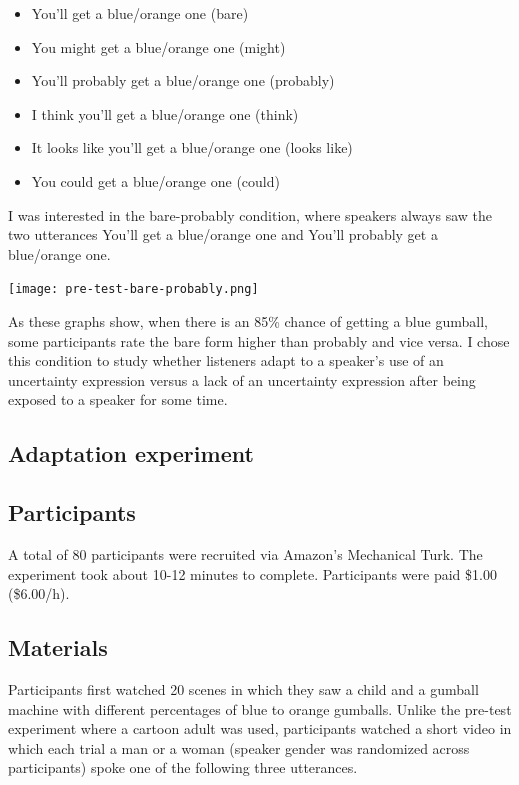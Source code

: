 \documentclass{sp}          %
\begin{document}
\begin{itemize}
\item You’ll get a blue/orange one (bare)
\item You might get a blue/orange one (might)
\item You’ll probably get a blue/orange one (probably)
\item I think you’ll get a blue/orange one (think)
\item It looks like you’ll get a blue/orange one (looks like) 
\item You could get a blue/orange one (could) 
\end{itemize}

I was interested in the bare-probably condition, where speakers always saw the two utterances You’ll get a blue/orange one and You’ll probably get a blue/orange one. 

\begin{center}
\texttt{[image: pre-test-bare-probably.png]}
\end{center}

As these graphs show, when there is an 85\% chance of getting a blue gumball, some participants rate the bare form higher than probably and vice versa. I chose this condition to study whether listeners adapt to a speaker’s use of an uncertainty expression versus a lack of an uncertainty expression after being exposed to a speaker for some time. 

\subsection{Adaptation experiment}

\subsection{Participants}
A total of 80 participants were recruited via Amazon’s Mechanical Turk. The experiment took about 10-12 minutes to complete. Participants were paid \$1.00 (\$6.00/h).

\subsection{Materials}


Participants first watched 20 scenes in which they saw a child and a gumball machine with different percentages of blue to orange gumballs. Unlike the pre-test experiment where a cartoon adult was used, participants watched a short video in which each trial a man or a woman (speaker gender was randomized across participants) spoke one of the following three utterances.
\end{document}
